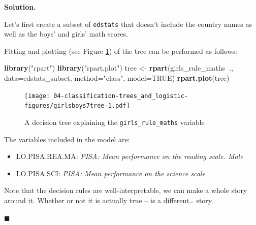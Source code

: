 \documentclass[10pt,b5paper,krantz1]{krantz}
\newenvironment{Shaded}{\begin{snugshade}}{\end{snugshade}}
\newcommand{\DataTypeTok}[1]{\textcolor[rgb]{0.27,0.27,0.27}{#1}}
\newcommand{\KeywordTok}[1]{\textcolor[rgb]{0.27,0.27,0.27}{\textbf{#1}}}
\newcommand{\NormalTok}[1]{#1}
\newcommand{\OperatorTok}[1]{\textcolor[rgb]{0.43,0.43,0.43}{\textbf{#1}}}
\newcommand{\OtherTok}[1]{\textcolor[rgb]{0.37,0.37,0.37}{#1}}
\newcommand{\StringTok}[1]{\textcolor[rgb]{0.5,0.5,0.5}{#1}}
\providecommand{\tightlist}{%
  \setlength{\itemsep}{0pt}\setlength{\parskip}{0pt}}
\newenvironment{solution}{%
\bigskip\noindent\textbf{Solution. }%
\it\ignorespaces%
\ignorespaces%
}{\ignorespaces%
\hfill$\blacksquare$%
}
\begin{document}
\begin{solution}

Let's first create a subset of \texttt{edstats} that doesn't include
the country names as well as the boys' and girls' math scores.

\begin{Shaded}
\end{Shaded}

Fitting and plotting (see Figure \ref{fig:girlsboys7tree})
of the tree can be performed as follows:

\begin{Shaded}
\begin{Highlighting}[]
\KeywordTok{library}\NormalTok{(}\StringTok{"rpart"}\NormalTok{)}
\KeywordTok{library}\NormalTok{(}\StringTok{"rpart.plot"}\NormalTok{)}
\NormalTok{tree <-}\StringTok{ }\KeywordTok{rpart}\NormalTok{(girls_rule_maths}\OperatorTok{~}\NormalTok{., }\DataTypeTok{data=}\NormalTok{edstats_subset,}
    \DataTypeTok{method=}\StringTok{"class"}\NormalTok{, }\DataTypeTok{model=}\OtherTok{TRUE}\NormalTok{)}
\KeywordTok{rpart.plot}\NormalTok{(tree)}
\end{Highlighting}
\end{Shaded}

\begin{figure}
\hypertarget{fig:girlsboys7tree}{%
\centering
\texttt{[image: 04-classification-trees\_and\_logistic-figures/girlsboys7tree-1.pdf]}
\caption{A decision tree explaining the \texttt{girls\_rule\_maths} variable}\label{fig:girlsboys7tree}
}
\end{figure}

The variables included in the model are:

\begin{itemize}
\tightlist
\item
  LO.PISA.REA.MA: \emph{PISA: Mean performance on the reading scale. Male}
\item
  LO.PISA.SCI: \emph{PISA: Mean performance on the science scale}
\end{itemize}

Note that the decision rules are well-interpretable, we can make a whole
story around it. Whether or not it is actually true -- is a different\ldots{} story.


\end{solution}
\end{document}
